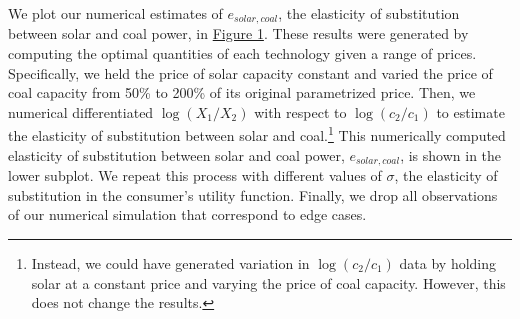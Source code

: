 \documentclass[11pt,a4paper]{extarticle}
\begin{document}
We plot our numerical estimates of $e_{solar, coal}$, the elasticity of substitution between solar and coal power, in \hyperref[fig:eosnum]{Figure 1}. These results were generated by computing the optimal quantities of each technology given a range of prices. Specifically, we held the price of solar capacity constant and varied the price of coal capacity from 50\% to 200\% of its original parametrized price. Then, we numerical differentiated $\log(X_1/X_2)$ with respect to $\log(c_2/c_1)$ to estimate the elasticity of substitution between solar and coal.\footnote{Instead, we could have generated variation in $\log(c_2/c_1)$ data by holding solar at a constant price and varying the price of coal capacity. However, this does not change the results.} This numerically computed elasticity of substitution between solar and coal power, $e_{solar,coal}$, is shown in the lower subplot. We repeat this process with different values of $\sigma$, the elasticity of substitution in the consumer's utility function. Finally, we drop all observations of our numerical simulation that correspond to edge cases.
\end{document}
